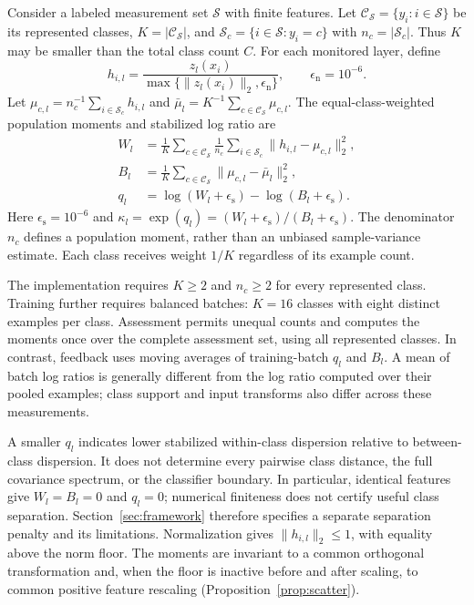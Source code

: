 \documentclass[10pt,a4paper,twocolumn]{article}
\newcommand{\epss}{\epsilon_{\mathrm{s}}}
\newcommand{\epsn}{\epsilon_{\mathrm{n}}}
\begin{document}
Consider a labeled measurement set $\mathcal S$ with finite features.
Let $\mathcal C_{\mathcal S}=\{y_i:i\in\mathcal S\}$ be its represented
classes, $K=|\mathcal C_{\mathcal S}|$, and
$\mathcal S_c=\{i\in\mathcal S:y_i=c\}$ with $n_c=|\mathcal S_c|$.
Thus $K$ may be smaller than the total class count $C$.
For each monitored layer, define
\begin{equation}
 h_{i,l}=\frac{z_l(x_i)}
 {\max\{\|z_l(x_i)\|_2,\epsn\}},
 \qquad \epsn=10^{-6}.
 \label{eq:normalized_features}
\end{equation}
Let $\mu_{c,l}=n_c^{-1}\sum_{i\in\mathcal S_c}h_{i,l}$ and
$\bar\mu_l=K^{-1}\sum_{c\in\mathcal C_{\mathcal S}}\mu_{c,l}$.
The equal-class-weighted population moments and stabilized log ratio are
\begin{align}
 W_l &=\frac1K\sum_{c\in\mathcal C_{\mathcal S}}\frac1{n_c}
       \sum_{i\in\mathcal S_c}\|h_{i,l}-\mu_{c,l}\|_2^2,\\
 B_l &=\frac1K\sum_{c\in\mathcal C_{\mathcal S}}\|\mu_{c,l}-\bar\mu_l\|_2^2,\\
 q_l &=\log(W_l+\epss)-\log(B_l+\epss).
 \label{eq:trace_ratio}
\end{align}
Here $\epss=10^{-6}$ and
$\kappa_l=\exp(q_l)=(W_l+\epss)/(B_l+\epss)$.
The denominator $n_c$ defines a population moment, rather than an
unbiased sample-variance estimate. Each class receives weight $1/K$
regardless of its example count.

The implementation requires $K\ge2$ and $n_c\ge2$ for every represented
class. Training further requires balanced batches: $K=16$ classes with
eight distinct examples per class. Assessment permits unequal counts
and computes the moments once over the complete assessment set, using
all represented classes. In contrast, feedback uses moving averages of
training-batch $q_l$ and $B_l$. A mean of batch log ratios is generally
different from the log ratio computed over their pooled examples;
class support and input transforms also differ across these measurements.

A smaller $q_l$ indicates lower stabilized within-class dispersion
relative to between-class dispersion. It does not determine every
pairwise class distance, the full covariance spectrum, or the classifier
boundary. In particular, identical features give $W_l=B_l=0$ and
$q_l=0$; numerical finiteness does not certify useful class separation.
Section~\ref{sec:framework} therefore specifies a separate separation
penalty and its limitations. Normalization gives $\|h_{i,l}\|_2\le1$,
with equality above the norm floor. The moments are invariant to a
common orthogonal transformation and, when the floor is inactive before
and after scaling, to common positive feature rescaling
(Proposition~\ref{prop:scatter}).
\end{document}
